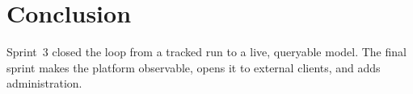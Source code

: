 \section*{Conclusion}
Sprint~3 closed the loop from a tracked run to a live, queryable model. The final
sprint makes the platform observable, opens it to external clients, and adds
administration.
